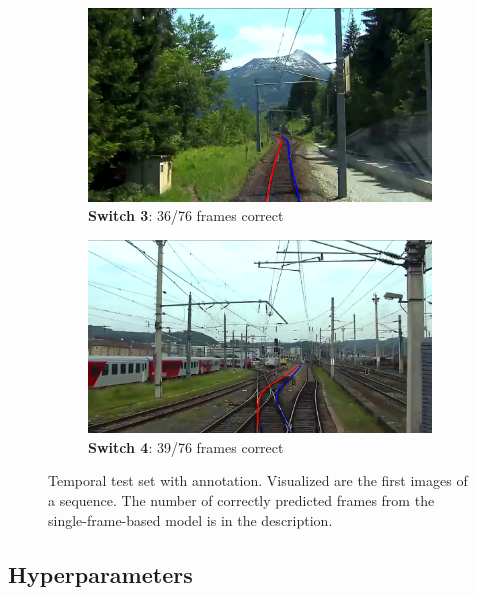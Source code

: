 \begin{figure}[H]
    \begin{subfigure}[b]{0.48\textwidth}
        \centering
        \includegraphics[width=\textwidth]{PICs/experiments/temporalModels/partlyRichtig.png}
        \caption{\textbf{Switch 3}: 36/76 frames correct}
    \end{subfigure}
    \hfill
    \begin{subfigure}[b]{0.48\textwidth}
        \centering
        \includegraphics[width=\textwidth]{PICs/experiments/temporalModels/partlyRichtig2.png}
        \caption{\textbf{Switch 4}: 39/76 frames correct}
    \end{subfigure}
    \caption{Temporal test set with annotation. Visualized are the first images of a sequence. The number of correctly predicted frames from the single-frame-based model is in the description.}
    \label{fig:temporalTestSet}
\end{figure}

\subsection{Hyperparameters}

